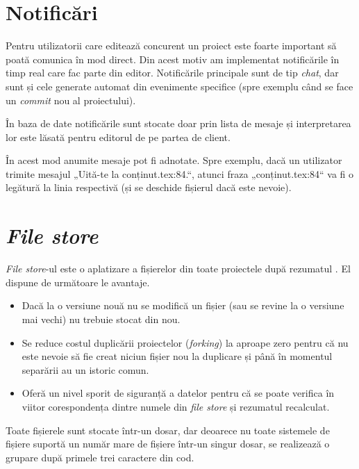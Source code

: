 \documentclass[a4wide,12pt]{report}
\newcommand{\eng}[1]{\emph{#1}} %
\newcommand{\acr}[1]{{\textsmaller[1]{\textsc{#1}}}} %
\begin{document}
\section{Notificări}
\label{notificarisec}

Pentru utilizatorii care editează concurent un proiect este foarte important să
poată comunica în mod direct. Din acest motiv am implementat notificările în
timp real care fac parte din editor. Notificările principale sunt de tip
\eng{chat}, dar sunt și cele generate automat din evenimente specifice (spre
exemplu când se face un \eng{commit} nou al proiectului).

În baza de date notificările sunt stocate doar prin lista de mesaje și
interpretarea lor este lăsată pentru editorul de pe partea de client.

În acest mod anumite mesaje pot fi adnotate. Spre exemplu, dacă un utilizator
trimite mesajul „Uită-te la conținut.tex:84.“, atunci fraza „conținut.tex:84“ va
fi o legătură la linia respectivă (și se deschide fișierul dacă este nevoie).

\section{\eng{File store}}

\eng{File store}-ul este o aplatizare a fișierelor din toate proiectele după
rezumatul \acr{SHA1}. El dispune de următoare le avantaje.

\begin{itemize}

\item Dacă la o versiune nouă nu se modifică un fișier (sau se revine la o
versiune mai vechi) nu trebuie stocat din nou.

\item Se reduce costul duplicării proiectelor (\eng{forking}) la aproape zero
pentru că nu este nevoie să fie creat niciun fișier nou la duplicare și până în
momentul separării au un istoric comun.

\item Oferă un nivel sporit de siguranță a datelor pentru că se poate verifica
în viitor corespondența dintre numele din \eng{file store} și rezumatul
\acr{SHA1} recalculat.

\end{itemize}

Toate fișierele sunt stocate într-un dosar, dar deoarece nu toate sistemele de
fișiere suportă un număr mare de fișiere într-un singur dosar, se realizează o
grupare după primele trei caractere din cod.
\end{document}

